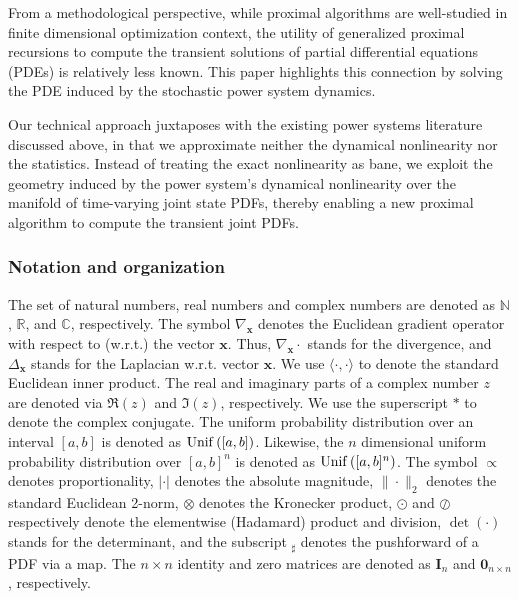 \documentclass[10pt,twocolumn]{IEEEtran}
\begin{document}
From a methodological perspective, while proximal algorithms are well-studied \cite{parikh2014proximal,rockafellar1976monotone,combettes2011proximal} in finite dimensional optimization context, the utility of generalized proximal recursions to compute the transient solutions of partial differential equations (PDEs) is relatively less known. This paper highlights this connection by solving the PDE induced by the stochastic power system dynamics.


Our technical approach juxtaposes with the existing power systems literature discussed above, in that we approximate neither the dynamical nonlinearity nor the statistics. Instead of treating the exact nonlinearity as bane, we exploit the geometry induced by the power system's dynamical nonlinearity over the manifold of time-varying joint state PDFs, thereby enabling a new proximal algorithm to compute the transient joint PDFs.

\subsubsection{Notation and organization}
The set of natural numbers, real numbers and complex numbers are denoted as $\mathbb{N}$, $\mathbb{R}$, and $\mathbb{C}$, respectively. The symbol $\nabla_{\bm{x}}$ denotes the Euclidean gradient operator with respect to (w.r.t.) the vector $\bm{x}$. Thus, $\nabla_{\bm{x}}\cdot$ stands for the divergence, and $\Delta_{\bm{x}}$ stands for the Laplacian w.r.t. vector $\bm{x}$. We use $\langle\cdot,\cdot\rangle$ to denote the standard Euclidean inner product. The real and imaginary parts of a complex number $z$ are denoted via $\Re(z)$ and $\Im(z)$, respectively. We use the superscript $*$ to denote the complex conjugate. The uniform probability distribution over an interval $[a,b]$ is denoted as ${\rm{Unif}}\left([a,b]\right)$. Likewise, the $n$ dimensional uniform probability distribution over $[a,b]^{n}$ is denoted as ${\rm{Unif}}\left([a,b]^{n}\right)$. The symbol $\propto$ denotes proportionality, $|\cdot|$ denotes the absolute magnitude, $\|\cdot\|_{2}$ denotes the standard Euclidean 2-norm, $\otimes$ denotes the Kronecker product, $\odot$ and $\oslash$ respectively denote the elementwise (Hadamard) product and division, $\det(\cdot)$ stands for the determinant, and the subscript $_{\sharp}$ denotes the pushforward of a PDF via a map. The $n\times n$ identity and zero matrices are denoted as $\bm{I}_{n}$ and $\bm{0}_{n\times n}$, respectively.
\end{document}
